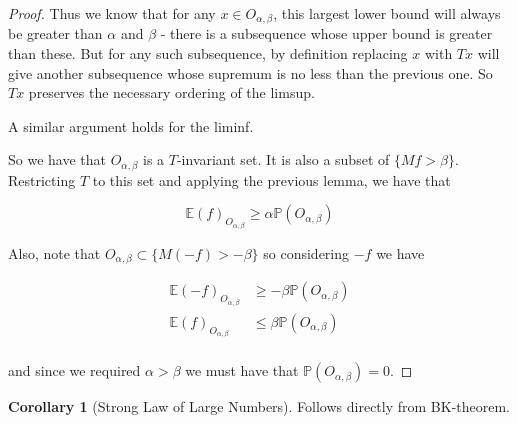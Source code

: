\documentclass[letterpaper,10pt,oneside,onecolumn,reqno]{amsart}
\newcommand{\E}{\mathbb E}
\renewcommand{\P}{\mathbb P}
\theoremstyle{definition}
\newtheorem{cor}[thm]{Corollary}
\begin{document}
\begin{proof}
Thus we know that for any $x \in O_{\alpha,\beta}$, this largest lower bound will always be greater than $\alpha$ and $\beta$ - there is a subsequence whose upper bound is greater than these. But for any such subsequence, by definition replacing $x$ with $Tx$ will give another subsequence whose supremum is no less than the previous one. So $Tx$ preserves the necessary ordering of the limsup. 

A similar argument holds for the liminf. 

So we have that $O_{\alpha,\beta}$ is a $T$-invariant set. It is also a subset of $\{Mf > \beta\}$. Restricting $T$ to this set and applying the previous lemma, we have that

\begin{equation}
\E(f)_{O_{\alpha,\beta}}\geq\alpha \P(O_{\alpha,\beta})
\end{equation}

Also, note that $O_{\alpha,\beta} \subset \{M(-f) > -\beta\}$ so considering $-f$ we have 

\begin{align*}
\E(-f)_{O_{\alpha,\beta}}&\geq-\beta \P(O_{\alpha,\beta}) \\
\E(f)_{O_{\alpha,\beta}}&\leq\beta \P(O_{\alpha,\beta}) \\
\end{align*}

and since we required $\alpha > \beta$ we must have that $\P(O_{\alpha,\beta}) = 0$.






		\end{proof}
		
		\begin{cor}[Strong Law of Large Numbers]
Follows directly from BK-theorem.		
		\end{cor}


	
\end{document}
